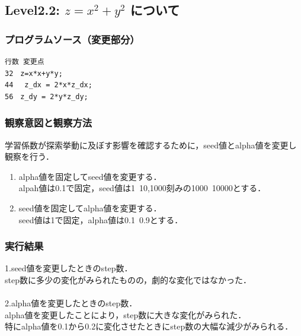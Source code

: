 \subsection{Level2.2: $z=x^2 + y^2$ について}
\subsubsection{プログラムソース（変更部分）}
\begin{breakbox}
\begin{verbatim}
行数 変更点
32　z=x*x+y*y;
44　 z_dx = 2*x*z_dx;
56　z_dy = 2*y*z_dy;
\end{verbatim}
\end{breakbox}

\subsubsection{観察意図と観察方法}

学習係数が探索挙動に及ぼす影響を確認するために，seed値とalpha値を変更し観察を行う．\\

\begin{enumerate}
\item alpha値を固定してseed値を変更する．\\
alpah値は0.1で固定，seed値は1~10,1000刻みの1000~10000とする．
\item seed値を固定してalpha値を変更する．\\
seed値は1で固定，alpha値は0.1~0.9とする．
\end{enumerate}

\subsubsection{実行結果}


1.seed値を変更したときのstep数．\\
step数に多少の変化がみられたものの，劇的な変化ではなかった．\\\\

2.alpha値を変更したときのstep数．\\


alpha値を変更したことにより，step数に大きな変化がみられた．\\
特にalpha値を0.1から0.2に変化させたときにstep数の大幅な減少がみられる．\\\\

